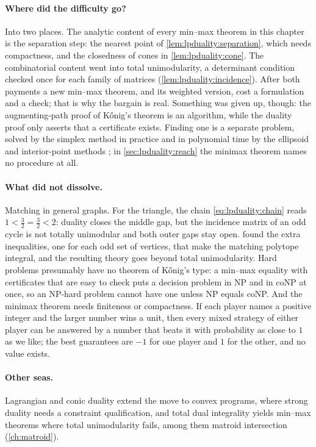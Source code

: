 \begin{refsection}
\paragraph{Where did the difficulty go?} Into two places. The analytic content of every min--max theorem in this chapter is the separation step: the nearest point of \cref{lem:lpduality:separation}, which needs compactness, and the closedness of cones in \cref{lem:lpduality:cone}. The combinatorial content went into total unimodularity, a determinant condition checked once for each family of matrices (\cref{lem:lpduality:incidence}). After both payments a new min--max theorem, and its weighted version, cost a formulation and a check; that is why the bargain is real. Something was given up, though: the augmenting-path proof of K\H{o}nig's theorem is an algorithm, while the duality proof only asserts that a certificate exists. Finding one is a separate problem, solved by the simplex method in practice and in polynomial time by the ellipsoid and interior-point methods \parencite{Schrijver1986}; in \cref{sec:lpduality:reach} the minimax theorem names no procedure at all.

\paragraph{What did not dissolve.} Matching in general graphs. For the triangle, the chain \eqref{eq:lpduality:chain} reads $1<\frac32=\frac32<2$: duality closes the middle gap, but the incidence matrix of an odd cycle is not totally unimodular and both outer gaps stay open. \textcite{Edmonds1965} found the extra inequalities, one for each odd set of vertices, that make the matching polytope integral, and the resulting theory goes beyond total unimodularity. Hard problems presumably have no theorem of K\H{o}nig's type: a min--max equality with certificates that are easy to check puts a decision problem in NP and in coNP at once, so an NP-hard problem cannot have one unless NP equals coNP. And the minimax theorem needs finiteness or compactness. If each player names a positive integer and the larger number wins a unit, then every mixed strategy of either player can be answered by a number that beats it with probability as close to $1$ as we like; the best guarantees are $-1$ for one player and $1$ for the other, and no value exists.

\paragraph{Other seas.} Lagrangian and conic duality extend the move to convex programs, where strong duality needs a constraint qualification, and total dual integrality \parencite{Schrijver1986} yields min--max theorems where total unimodularity fails, among them matroid intersection (\cref{ch:matroid}).


\end{refsection}
